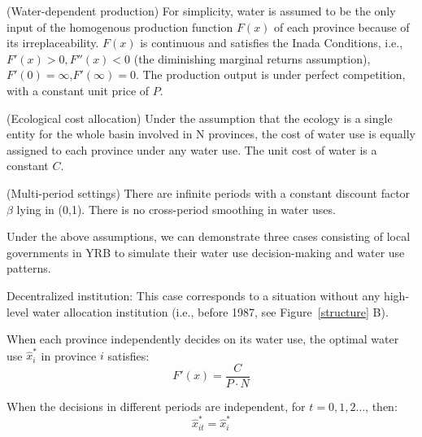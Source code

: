 \documentclass{../nsr}
\begin{document}
\begin{ass}
    (Water-dependent production) For simplicity, water is assumed to be the only input of the homogenous production function $F(x)$ of each province because of its irreplaceability. $F(x)$ is continuous and satisfies the Inada Conditions, i.e., $F'(x)>0, F''(x)<0$ (the diminishing marginal returns assumption), $F'(0)=\infty$,$ F'(\infty)=0$. The production output is under perfect competition, with a constant unit price of $P$.
\end{ass}
\begin{ass}
    (Ecological cost allocation) Under the assumption that the ecology is a single entity for the whole basin involved in N provinces, the cost of water use is equally assigned to each province under any water use. The unit cost of water is a constant $C$.
\end{ass}
\begin{ass}
    (Multi-period settings) There are infinite periods with a constant discount factor $\beta$ lying in (0,1). There is no cross-period smoothing in water uses.
\end{ass}

Under the above assumptions, we can demonstrate three cases consisting of local governments in YRB to simulate their water use decision-making and water use patterns.

\begin{case} Decentralized institution:
    This case corresponds to a situation without any high-level water allocation institution (i.e., before 1987, see Figure~\ref{structure} B).

    When each province independently decides on its water use, the optimal water use $\hat x_i^*$ in province $i$ satisfies:
    $$F'(x)=\frac{C}{P \cdot N}$$

    When the decisions in different periods are independent, for $t=0,1,2 \ldots$, then:
    $$\hat x_{it}^*=\hat x_i^*$$

\end{case}
\end{document}
